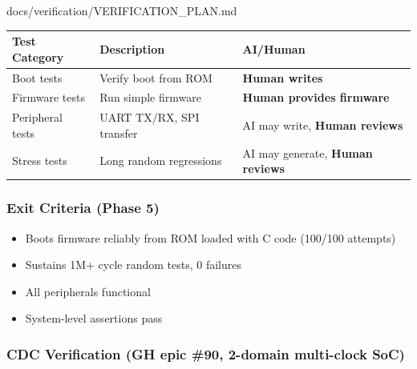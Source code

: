 \begin{relocated}{docs/verification/VERIFICATION_PLAN.md}
{
\begin{longtable}[]{@{}
  >{\centering\arraybackslash}p{}
  >{\centering\arraybackslash}p{}
  >{\centering\arraybackslash}p{}@{}}
\toprule\noalign{}
\begin{minipage}[b]{\linewidth}\centering
Test Category
\end{minipage} & \begin{minipage}[b]{\linewidth}\centering
Description
\end{minipage} & \begin{minipage}[b]{\linewidth}\centering
AI/Human
\end{minipage} \\
\midrule\noalign{}
\endhead
\bottomrule\noalign{}
\endlastfoot
Boot tests & Verify boot from ROM & \textbf{Human writes} \\
Firmware tests & Run simple firmware & \textbf{Human provides
firmware} \\
Peripheral tests & UART TX/RX, SPI transfer & AI may write,
\textbf{Human reviews} \\
Stress tests & Long random regressions & AI may generate, \textbf{Human
reviews} \\
\end{longtable}
}

\subsubsection{Exit Criteria (Phase 5)}\label{ds:ch:verification-plan:exit-criteria-phase-5}

\begin{itemize}
\tightlist
\item
  Boots firmware reliably from ROM loaded with C code (100/100 attempts)
\item
  Sustains 1M+ cycle random tests, 0 failures
\item
  All peripherals functional
\item
  System-level assertions pass
\end{itemize}

\subsubsection{CDC Verification (GH epic \#90, 2-domain multi-clock
SoC)}\label{ds:ch:verification-plan:cdc-verification-gh-epic-90-2-domain-multi-clock-soc}


\end{relocated}
